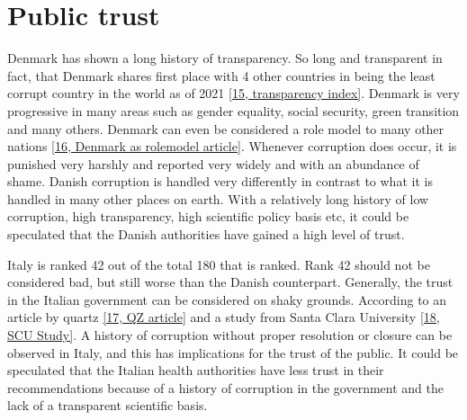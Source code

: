 \section*{Public trust}
Denmark has shown a long history of transparency. 
So long and transparent in fact, that Denmark shares first place with 4 other countries in being the least corrupt country in the world as of 2021 \href{https://www.transparency.org/en/cpi/2021}{[15, transparency index]}. 
Denmark is very progressive in many areas such as gender equality, social security, green transition and many others. Denmark can even be considered a role model to many other nations \href{https://d.newsweek.com/en/file/462486/denmark-report.pdf}{[16, Denmark as rolemodel article]}.
Whenever corruption does occur, it is punished very harshly and reported very widely and with an abundance of shame. Danish corruption is handled very differently in contrast to what it is handled in many other places on earth.
With a relatively long history of low corruption, high transparency, high scientific policy basis etc, it could be speculated that the Danish authorities have gained a high level of trust. 

Italy is ranked 42 out of the total 180 that is ranked. Rank 42 should not be considered bad, but still worse than the Danish counterpart.
Generally, the trust in the Italian government can be considered on shaky grounds. According to an article by quartz \href{https://www.scu.edu/ethics/focus-areas/journalism-and-media-ethics/resources/the-trust-issue-in-italy/}{[17, QZ article]} and a study from Santa Clara University \href{https://www.scu.edu/ethics/focus-areas/journalism-and-media-ethics/resources/the-trust-issue-in-italy/}{[18, SCU Study]}.
A history of corruption without proper resolution or closure can be observed in Italy, and this has implications for the trust of the public.
It could be speculated that the Italian health authorities have less trust in their recommendations because of a history of corruption in the government and the lack of a transparent scientific basis.

